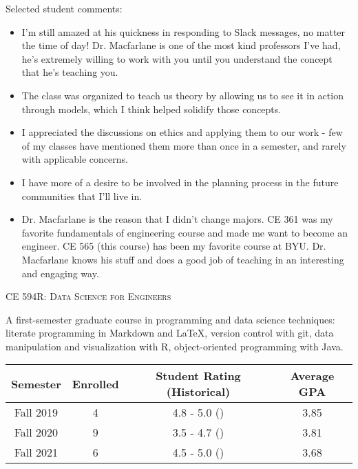 \documentclass[margin,line]{res}
\newif\ifdetail
\newcommand{\acc}{\scshape }
\begin{document}
\begin{resume}
\begin{tabular}{cccc}
\end{tabular}

Selected student comments:
\begin{itemize}
  \item  I'm still amazed at his quickness in responding to Slack messages, no matter
    the time of day! Dr. Macfarlane is one of the most kind professors I've had,
    he's extremely willing to work with you until you understand the concept
    that he's teaching you.
  \item The class was organized to teach us theory by allowing us to see it in action through models, which I think helped solidify those concepts.
  \item I appreciated the discussions on ethics and applying them to our work - few of my classes have mentioned them more than once in a semester, and rarely with applicable concerns.
  \item I have more of a desire to be involved in the planning process in the future communities that I'll live in.
  \item Dr. Macfarlane is the reason that I didn't change majors. CE 361 was my favorite fundamentals of engineering course and made me want to become an engineer. CE 565 (this course) has been my favorite course at BYU. Dr. Macfarlane knows his stuff and does a good job of teaching in an interesting and engaging way.
\end{itemize}

\fi

\vspace{.4cm}
{\acc CE 594R: Data Science for Engineers}

\vspace{-.4cm}
A first-semester graduate course in programming and data science techniques:
literate programming in Markdown and LaTeX, version control with git, data
manipulation and visualization with R, object-oriented programming with Java.

\ifdetail
\begin{tabular}{cccc}
  \toprule
  Semester & Enrolled & Student Rating (Historical) & Average GPA\\
  \midrule
  Fall 2019 & 4 & 4.8 - 5.0 () & 3.85 \\
  Fall 2020 & 9 & 3.5 - 4.7 () & 3.81 \\
  Fall 2021 & 6 & 4.5 - 5.0 () & 3.68\\
  \bottomrule

\end{tabular}


\end{resume}
\end{document}
